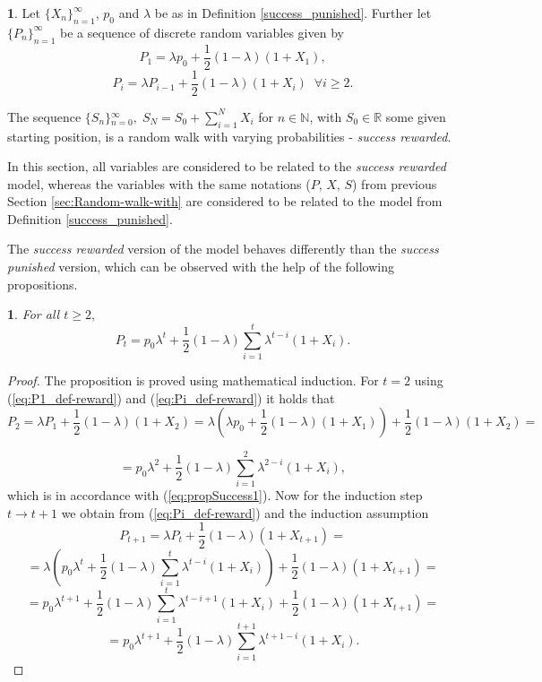 \documentclass{amsart}
\theoremstyle{definition}
\newtheorem{defn}[thm]{\protect\definitionname}
\theoremstyle{plain}
\newtheorem{prop}[thm]{\protect\propositionname}
\theoremstyle{plain}
\theoremstyle{plain}
\numberwithin{equation}{section}
\providecommand{\definitionname}{Definition}
\providecommand{\propositionname}{Proposition}
\begin{document}
\begin{defn}
\label{succes_rewarded}Let ${\{X_{n}\}}_{n=1}^{\infty}$, $p_{0}$
and $\lambda$ be as in Definition \ref{success_punished}. Further
let ${\{P_{n}\}}_{n=1}^{\infty}$ be a sequence of discrete random
variables given by
\begin{equation}
P_{1}=\lambda p_{0}+\frac{1}{2}(1-\lambda)(1+X_{1}),\label{eq:P1_def-reward}
\end{equation}
\begin{equation}
P_{i}=\lambda P_{i-1}+\frac{1}{2}(1-\lambda)(1+X_{i})\;\;\forall i\geq2.\label{eq:Pi_def-reward}
\end{equation}

The sequence ${\{S_{n}\}}{}_{n=0}^{\infty},\;S_{N}=S_{0}+\sum_{i=1}^{N}X_{i}$
for $n\in\mathbb{N}$, with $S_{0}\in\mathbb{R}$ some given starting
position, is a random walk with varying probabilities - \emph{success
rewarded}.
\end{defn}

In this section, all variables are considered to be related to the
\emph{success rewarded }model, whereas the variables with the same
notations ($P,\,X,\,S$) from previous Section \ref{sec:Random-walk-with}
are considered to be related to the model from Definition \ref{success_punished}.

The \emph{success rewarded} version of the model behaves differently
than the \emph{success punished} version, which can be observed with
the help of the following propositions.

\begin{prop}
For all $t\ge 2,$
\begin{equation}
P_{t}=p_{0}\lambda^{t}+\frac{1}{2}(1-\lambda)\sum_{i=1}^{t}\lambda^{t-i}(1+X_{i}).\label{eq:propSuccess1}
\end{equation}
\end{prop}

\begin{proof}
The proposition is proved using mathematical induction. For $t=2$ using (\ref{eq:P1_def-reward})
and (\ref{eq:Pi_def-reward}) it holds that
\[
P_{2}=\lambda P_{1}+\frac{1}{2}(1-\lambda)(1+X_{2})=\lambda(\lambda p_{0}+\frac{1}{2}(1-\lambda)(1+X_{1}))+\frac{1}{2}(1-\lambda)(1+X_{2})=
\]

\[
=p_{0}\lambda^{2}+\frac{1}{2}(1-\lambda)\sum_{i=1}^{2}\lambda^{2-i}(1+X_{i}),
\]
which is in accordance with (\ref{eq:propSuccess1}). Now for the
induction step $t\rightarrow t+1$ we obtain from (\ref{eq:Pi_def-reward})
and the induction assumption
\[
P_{t+1}=\lambda P_{t}+\frac{1}{2}(1-\lambda)(1+X_{t+1})=
\]
\[
=\lambda(p_{0}\lambda^{t}+\frac{1}{2}(1-\lambda)\sum_{i=1}^{t}\lambda^{t-i}(1+X_{i}))+\frac{1}{2}(1-\lambda)(1+X_{t+1})=
\]
\[
=p_{0}\lambda^{t+1}+\frac{1}{2}(1-\lambda)\sum_{i=1}^{t}\lambda^{t-i+1}(1+X_{i})+\frac{1}{2}(1-\lambda)(1+X_{t+1})=
\]
\[
=p_{0}\lambda^{t+1}+\frac{1}{2}(1-\lambda)\sum_{i=1}^{t+1}\lambda^{t+1-i}(1+X_{i}).
\]
\end{proof}
\end{document}
